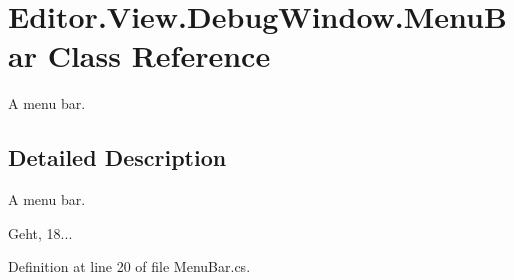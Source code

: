 \section{Editor.\-View.\-Debug\-Window.\-Menu\-Bar Class Reference}
\label{class_editor_1_1_view_1_1_debug_window_1_1_menu_bar}


A menu bar.  




\subsection{Detailed Description}
A menu bar. 

Geht, 18... 

Definition at line 20 of file Menu\-Bar.\-cs.

